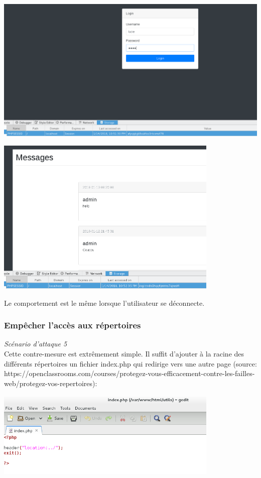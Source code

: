 \documentclass{article}
\begin{document}
\includegraphics[width=\textwidth]{images/session1.PNG}
\begin{center}\includegraphics[width=0.8\textwidth]{images/session2.PNG}\end{center}

Le comportement est le même lorsque l'utilisateur se déconnecte.

\subsubsection{Empêcher l'accès aux répertoires}

\textit{Scénario d'attaque 5}\\

Cette contre-mesure est extrêmement simple. Il suffit d'ajouter à la
racine des différents répertoires un fichier index.php qui redirige vers
une autre page (source: https://openclassrooms.com/courses/protegez-vous-efficacement-contre-les-failles-web/protegez-vos-repertoires):

\begin{center}\includegraphics[width=0.8\textwidth]{images/repertoire_fix.PNG}\end{center}
\end{document}
